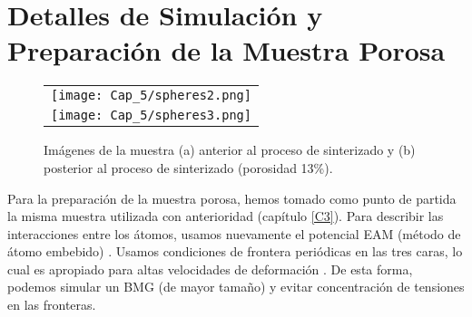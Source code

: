 
\section{Detalles de Simulación y Preparación de la Muestra Porosa}
\label{S5_2}


\begin{figure}[h!]
  \centering
  \begin{tabular} {c}
    \texttt{[image: Cap\_5/spheres2.png]}\\
    \texttt{[image: Cap\_5/spheres3.png]}\\
  \end{tabular}
  \caption[Imágenes de la muestra]{Imágenes de la muestra (a) anterior al proceso de sinterizado y (b) posterior
  al proceso de sinterizado (porosidad 13\%).}
  \label{C5:fg:sint}
\end{figure}

Para la preparación de la muestra porosa, hemos tomado como punto de partida la misma muestra utilizada con anterioridad (capítulo \ref{C3}).
Para describir las interacciones
entre los átomos, usamos nuevamente el potencial EAM (método de átomo embebido) \citep{daw84}. Usamos condiciones de frontera periódicas en las
tres caras, lo cual es apropiado para altas velocidades de deformación \citep{bringa05}. De esta forma, podemos simular un BMG (de mayor tamaño)
y evitar concentración de tensiones en las fronteras.

